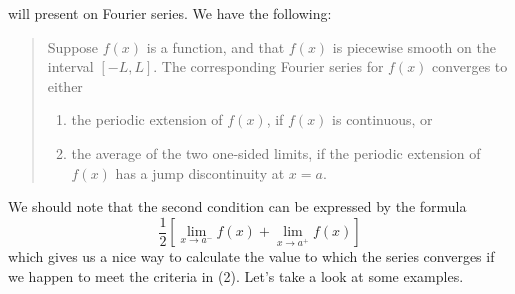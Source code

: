 will present on Fourier series. We have the following:
\begin{quote}
Suppose $f(x)$ is a function, and that $f(x)$ is piecewise smooth on the interval
$[-L,L]$. The corresponding Fourier series for $f(x)$ converges to either
\begin{enumerate}
\item the periodic extension of $f(x)$, if $f(x)$ is continuous, or
\item the average of the two one-sided limits, if the periodic extension of
$f(x)$ has a jump discontinuity at $x = a$.
\end{enumerate}
\end{quote}
\noindent We should note that the second condition can be expressed by the formula
\[\frac{1}{2}\left[\lim_{x \to a^{-}}f(x) + \lim_{x \to a^{+}}f(x)\right]\]
which gives us a nice way to calculate the value to which the series converges
if we happen to meet the criteria in (2). Let's take a look at some examples.\\\\



